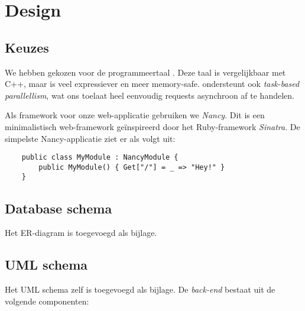 \documentclass[12pt,a4paper]{article}
\begin{document}
\section{Design}

\subsection{Keuzes}
We hebben gekozen voor de programmeertaal \CS{}. Deze taal is vergelijkbaar met
C++, maar is veel expressiever en meer memory-safe. \CS{} ondersteunt ook 
\textit{task-based parallellism}, wat ons toelaat heel eenvoudig requests 
asynchroon af te handelen.

Als framework voor onze web-applicatie gebruiken we \textit{Nancy}. Dit is een 
minimalistisch web-framework ge\"inspireerd door het Ruby-framework 
\textit{Sinatra}. De simpelste Nancy-applicatie ziet er als volgt uit:

\begin{lstlisting}
    public class MyModule : NancyModule {
        public MyModule() { Get["/"] = _ => "Hey!" }
    }
\end{lstlisting}

\subsection{Database schema}
Het ER-diagram is toegevoegd als bijlage.

\subsection{UML schema}

Het UML schema zelf is toegevoegd als bijlage. De \emph{back-end} bestaat uit de volgende componenten:
\end{document}
